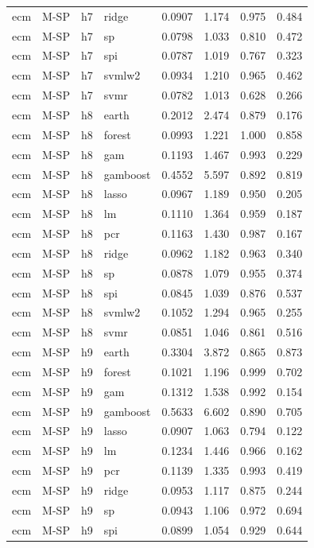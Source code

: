 \begin{ThreePartTable}
\begin{longtable}[t]{llclcccc}
ecm & M-SP & h7 & ridge & 0.0907 & 1.174 & 0.975 & 0.484\\
ecm & M-SP & h7 & sp & 0.0798 & 1.033 & 0.810 & 0.472\\
ecm & M-SP & h7 & spi & 0.0787 & 1.019 & 0.767 & 0.323\\
ecm & M-SP & h7 & svmlw2 & 0.0934 & 1.210 & 0.965 & 0.462\\
ecm & M-SP & h7 & svmr & 0.0782 & 1.013 & 0.628 & 0.266\\
\addlinespace
ecm & M-SP & h8 & earth & 0.2012 & 2.474 & 0.879 & 0.176\\
ecm & M-SP & h8 & forest & 0.0993 & 1.221 & 1.000 & 0.858\\
ecm & M-SP & h8 & gam & 0.1193 & 1.467 & 0.993 & 0.229\\
ecm & M-SP & h8 & gamboost & 0.4552 & 5.597 & 0.892 & 0.819\\
ecm & M-SP & h8 & lasso & 0.0967 & 1.189 & 0.950 & 0.205\\
ecm & M-SP & h8 & lm & 0.1110 & 1.364 & 0.959 & 0.187\\
ecm & M-SP & h8 & pcr & 0.1163 & 1.430 & 0.987 & 0.167\\
ecm & M-SP & h8 & ridge & 0.0962 & 1.182 & 0.963 & 0.340\\
ecm & M-SP & h8 & sp & 0.0878 & 1.079 & 0.955 & 0.374\\
ecm & M-SP & h8 & spi & 0.0845 & 1.039 & 0.876 & 0.537\\
ecm & M-SP & h8 & svmlw2 & 0.1052 & 1.294 & 0.965 & 0.255\\
ecm & M-SP & h8 & svmr & 0.0851 & 1.046 & 0.861 & 0.516\\
\addlinespace
ecm & M-SP & h9 & earth & 0.3304 & 3.872 & 0.865 & 0.873\\
ecm & M-SP & h9 & forest & 0.1021 & 1.196 & 0.999 & 0.702\\
ecm & M-SP & h9 & gam & 0.1312 & 1.538 & 0.992 & 0.154\\
ecm & M-SP & h9 & gamboost & 0.5633 & 6.602 & 0.890 & 0.705\\
ecm & M-SP & h9 & lasso & 0.0907 & 1.063 & 0.794 & 0.122\\
ecm & M-SP & h9 & lm & 0.1234 & 1.446 & 0.966 & 0.162\\
ecm & M-SP & h9 & pcr & 0.1139 & 1.335 & 0.993 & 0.419\\
ecm & M-SP & h9 & ridge & 0.0953 & 1.117 & 0.875 & 0.244\\
ecm & M-SP & h9 & sp & 0.0943 & 1.106 & 0.972 & 0.694\\
ecm & M-SP & h9 & spi & 0.0899 & 1.054 & 0.929 & 0.644\\

\end{longtable}
\end{ThreePartTable}
